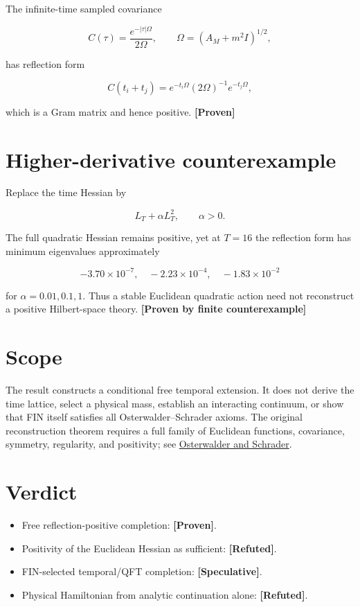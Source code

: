 \documentclass[11pt,a4paper,openany]{report}
\newcommand{\statusProven}{\textcolor{fingreen}{[Proven]}}
\newcommand{\statusSpeculative}{\textcolor{finorange}{[Speculative]}}
\newcommand{\statusRefuted}{\textcolor{finred}{[Refuted]}}
\begin{document}
The infinite-time sampled covariance

\[
C(\tau)=\frac{e^{-|\tau|\Omega}}{2\Omega},
\qquad
\Omega=(A_M+m^2I)^{1/2},
\]

has reflection form

\[
C(t_i+t_j)
=e^{-t_i\Omega}(2\Omega)^{-1}e^{-t_j\Omega},
\]

which is a Gram matrix and hence positive. \textbf{\statusProven{}}

\section{Higher-derivative counterexample}

Replace the time Hessian by

\[
L_T+\alpha L_T^2,
\qquad \alpha>0.
\]

The full quadratic Hessian remains positive, yet at \(T=16\) the reflection form has minimum eigenvalues approximately

\[
-3.70\times10^{-7},\quad
-2.23\times10^{-4},\quad
-1.83\times10^{-2}
\]

for \(\alpha=0.01,0.1,1\). Thus a stable Euclidean quadratic action need not reconstruct a positive Hilbert-space theory. \textbf{[Proven by finite counterexample]}

\section{Scope}

The result constructs a conditional free temporal extension. It does not derive the time lattice, select a physical mass, establish an interacting continuum, or show that FIN itself satisfies all Osterwalder–Schrader axioms. The original reconstruction theorem requires a full family of Euclidean functions, covariance, symmetry, regularity, and positivity; see \href{https://projecteuclid.org/euclid.cmp/1103858969}{Osterwalder and Schrader}.

\section{Verdict}

\begin{itemize}
\item 
Free reflection-positive completion: \textbf{\statusProven{}}.

\item 
Positivity of the Euclidean Hessian as sufficient: \textbf{\statusRefuted{}}.

\item 
FIN-selected temporal/\allowbreak{}QFT completion: \textbf{\statusSpeculative{}}.

\item 
Physical Hamiltonian from analytic continuation alone: \textbf{\statusRefuted{}}.

\end{itemize}
\end{document}
